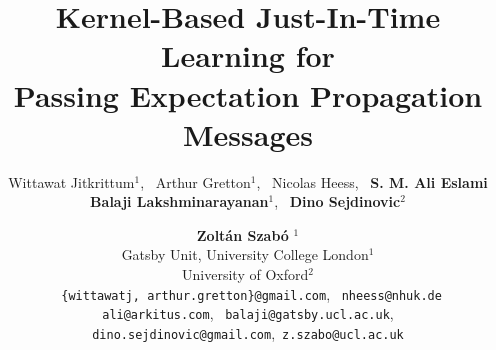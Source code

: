 \documentclass[english]{article}
\theoremstyle{plain}
\theoremstyle{plain}
\begin{document}
\title{Kernel-Based Just-In-Time Learning for \\Passing Expectation Propagation
Messages}

\author{
Wittawat Jitkrittum$^1$, \, Arthur Gretton$^1$, \, Nicolas Heess, \, \textbf{S. M. Ali Eslami} \\
\textbf{Balaji Lakshminarayanan}$^1$, \, \textbf{Dino Sejdinovic}$^2$ \and \textbf{ Zolt{\'a}n Szab{\'o} }$^1$  \vspace*{2mm} \\
Gatsby Unit, University College London$^1$ \\
\vspace*{2mm}
University of Oxford$^2$ \\
\texttt{ \{wittawatj,  arthur.gretton\}@gmail.com}, \, \texttt{nheess@nhuk.de} \\ 
\texttt{ali@arkitus.com}, \, \texttt{balaji@gatsby.ucl.ac.uk},\\
\texttt{dino.sejdinovic@gmail.com},\, \texttt{z.szabo@ucl.ac.uk}
}

\maketitle
\end{document}
